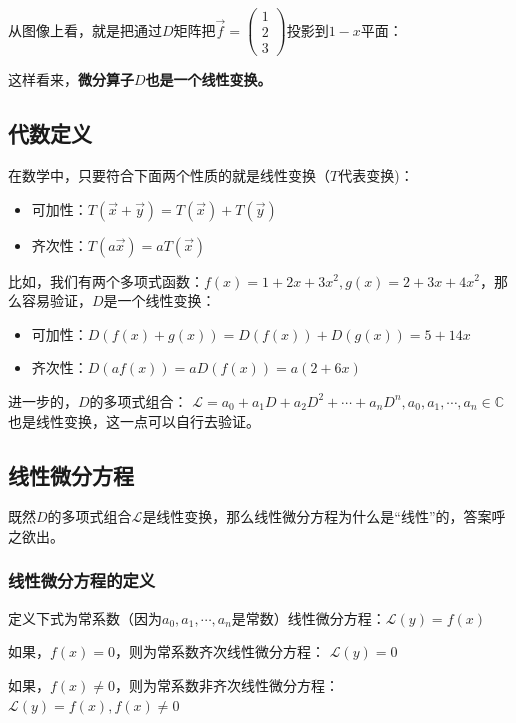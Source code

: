 \documentclass[12pt]{article}
\begin{document}
从图像上看，就是把通过$D$矩阵把$\vec{f_{}}=\begin{pmatrix}1\\2\\3\end{pmatrix}$投影到$1-x$平面：

这样看来，\textbf{微分算子$D$也是一个线性变换。}

\subsection{代数定义}
在数学中，只要符合下面两个性质的就是线性变换（$T$代表变换)：
\begin{itemize}
\setlength{\itemsep}{0pt}
\setlength{\parsep}{0pt}
\setlength{\parskip}{0pt}
    \item 可加性：$T(\vec{x_{}}+\vec{y_{}})=T(\vec{x_{}})+T(\vec{y_{}})$
    \item 齐次性：$T(a\vec{x_{}})=aT(\vec{x_{}})$
\end{itemize}

比如，我们有两个多项式函数：$f(x)=1+2x+3x^2, g(x)=2+3x+4x^2$，那么容易验证，$D$是一个线性变换：
\begin{itemize}
\setlength{\itemsep}{0pt}
\setlength{\parsep}{0pt}
\setlength{\parskip}{0pt}
    \item 可加性：$D(f(x)+g(x))=D(f(x))+D(g(x))=5+14x$
    \item 齐次性：$D(af(x))=aD(f(x))=a(2+6x)$
\end{itemize}


进一步的，$D$的多项式组合：
$\mathcal{L}=a_0+a_1D+a_2D^2+\cdots+a_nD^n,a_0,a_1,\cdots,a_n\in\mathbb{C}$
也是线性变换，这一点可以自行去验证。

\subsection{线性微分方程}
既然$D$的多项式组合$\mathcal{L}$是线性变换，那么线性微分方程为什么是“线性”的，答案呼之欲出。

\subsubsection{线性微分方程的定义}
定义下式为常系数（因为$a_0,a_1,\cdots,a_n$是常数）线性微分方程：$\mathcal L(y)=f(x)$

如果，$f(x)=0$，则为常系数齐次线性微分方程：
$\mathcal L(y)=0$

如果，$f(x)\ne0$，则为常系数非齐次线性微分方程：
$\mathcal L(y)=f(x),f(x)\ne0$
\end{document}
